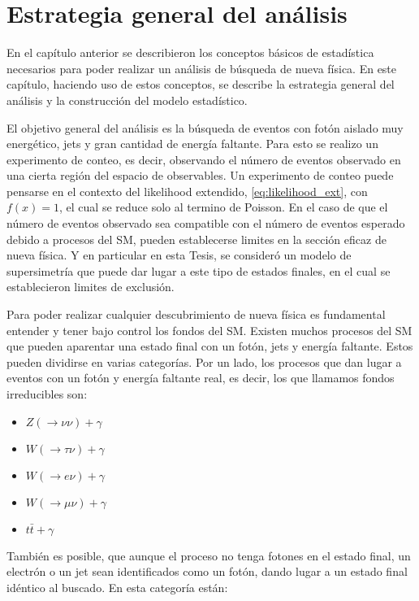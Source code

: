 \chapter{Estrategia general del análisis}

En el capítulo anterior se describieron los conceptos básicos de estadística
necesarios para poder realizar un análisis de búsqueda de nueva física. En este
capítulo, haciendo uso de estos conceptos, se describe la estrategia general del
análisis y la construcción del modelo estadístico.

El objetivo general del análisis es la búsqueda de eventos con fotón aislado muy
energético, jets y gran cantidad de energía faltante. Para esto se realizo un
experimento de conteo, es decir, observando el número de eventos observado en
una cierta región del espacio de observables. Un experimento de conteo puede
pensarse en el contexto del likelihood extendido, \cref{eq:likelihood_ext}, con
$f(x) = 1$, el cual se reduce solo al termino de Poisson. En el caso de que el
número de eventos observado sea compatible con el número de eventos esperado
debido a procesos del SM, pueden establecerse limites en la sección eficaz
de nueva física. Y en particular en esta Tesis, se consideró un modelo
de supersimetría que puede dar lugar a este tipo de estados finales, en el cual
se establecieron limites de exclusión.

Para poder realizar cualquier descubrimiento de nueva física es fundamental entender
y tener bajo control los fondos del SM.
Existen muchos procesos del SM que pueden aparentar una estado final con un fotón,
jets y energía faltante. Estos pueden dividirse en varias categorías. Por un lado, los
procesos que dan lugar a eventos con un fotón y energía faltante real, es decir, los
que llamamos fondos irreducibles son:

\begin{itemize}
\item $Z(\to\nu\nu)+\gamma$
\item $W(\to\tau\nu)+\gamma$ %
\item $W(\to e\nu)+\gamma$ %
\item $W(\to\mu\nu)+\gamma$ %
\item $t\bar{t}+\gamma$ %
\end{itemize}
%
También es posible, que aunque el proceso no tenga fotones en el estado final, un
electrón o un jet sean identificados como un fotón, dando lugar a un estado final
idéntico al buscado. En esta categoría están:


